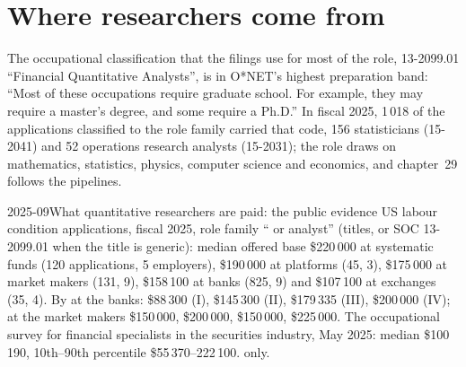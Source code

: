 \section{Where researchers come from}

The occupational classification that the filings use for most of the role, 13-2099.01 ``Financial Quantitative
Analysts'', is in O*NET's highest preparation band: ``Most of these occupations require graduate
school. For example, they may require a master's degree, and some require a Ph.D.'' In fiscal 2025, 1\,018 of the
applications classified to the role family carried that code, 156 statisticians (15-2041) and 52 operations research
analysts (15-2031); the role draws on mathematics, statistics, physics, computer science and economics, and chapter~29
follows the pipelines.

\begin{dated}{2025-09}{What quantitative researchers are paid: the public evidence}\label{dat:in:quant-researcher:pay}
US labour condition applications, fiscal 2025, role family `` or analyst'' (titles, or SOC
13-2099.01 when the title is generic): median offered base \$220\,000 at systematic funds (120 applications, 5 employers),
\$190\,000 at platforms (45, 3), \$175\,000 at market makers (131, 9), \$158\,100 at banks (825, 9) and \$107\,100 at
exchanges (35, 4). By  at the banks: \$88\,300 (I), \$145\,300 (II), \$179\,335 (III), \$200\,000 (IV); at the
market makers \$150\,000, \$200\,000, \$150\,000, \$225\,000. The occupational survey for financial specialists in the
securities industry, May 2025: median \$100\,190, 10th--90th percentile \$55\,370--222\,100.  only.
\end{dated}

